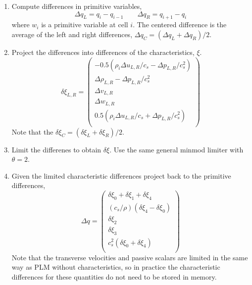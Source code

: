 \documentclass{article}
\begin{document}
\begin{enumerate}
 \item Compute differences in primitive variables, 
 \begin{equation}
  \Delta q_L = q_{i} - q_{i-1} \qquad \Delta q_R = q_{i+1} - q_i
 \end{equation}
 where $w_i$ is a primitive variable at cell $i$. 
 The centered difference is the average of the left and right differences, $\Delta q_C = (\Delta q_L + \Delta q_R)/2$. 
 
 \item Project the differences into differences of the characteristics, $\xi$. 
 \begin{equation}
    \delta \xi_{L,R} = 
    \begin{pmatrix}
     -0.5 \left( \rho_i \Delta u_{L,R} / c_s - \Delta p_{L,R} /c_s^2 \right) \\
     \Delta \rho_{L,R} - \Delta p_{L,R} /c_s^2 \\
     \Delta v_{L,R} \\ 
     \Delta w_{L,R} \\ 
    0.5 \left( \rho_i \Delta u_{L,R} / c_s + \Delta p_{L,R} /c_s^2 \right) \\
    \end{pmatrix}
 \end{equation}
Note that the $\delta \xi_C = (\delta \xi_L + \delta \xi_R)/2$. 

\item Limit the differenes to obtain $\delta \xi$. Use the same general minmod limiter with $\theta = 2$. 

\item Given the limited characteristic differences project back to the primitive differences,
\begin{equation}
 \Delta q = 
 \begin{pmatrix}
    \delta \xi_0 + \delta \xi_1 + \delta \xi_4 \\
    (c_s/\rho) ( \delta \xi_4 - \delta \xi_0) \\
    \delta \xi_2  \\
    \delta \xi_3 \\
    c_s^2 ( \delta \xi_0 + \delta \xi_4 ) \\
 \end{pmatrix}
\end{equation}
Note that the transverse velocities and passive scalars are limited in the same way as PLM without characteristics, so in practice the characteristic differences for these quantities do not need to be stored in memory. 


\end{enumerate}
\end{document}

